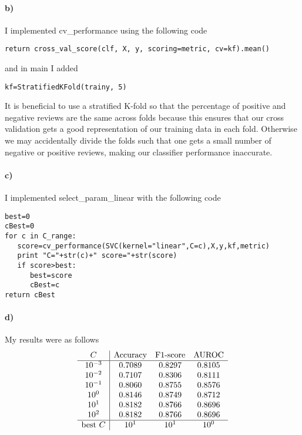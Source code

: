 \documentclass[12pt]{article}
\begin{document}
\paragraph{b)}

I implemented cv\_performance using the following code
\begin{verbatim}
return cross_val_score(clf, X, y, scoring=metric, cv=kf).mean()
\end{verbatim}
and in main I added
\begin{verbatim}
kf=StratifiedKFold(trainy, 5)
\end{verbatim}

It is beneficial to use a stratified K-fold so that the percentage of positive and negative reviews are the same across folds
because this ensures that our cross validation gets a good representation of our training data in each fold. Otherwise
we may accidentally divide the folds such that one gets a small number of negative or positive reviews, making our classifier
performance inaccurate.

\paragraph{c)}

I implemented select\_param\_linear with the following code
\begin{verbatim}
best=0
cBest=0
for c in C_range:
   score=cv_performance(SVC(kernel="linear",C=c),X,y,kf,metric)
   print "C="+str(c)+" score="+str(score)
   if score>best:
      best=score
      cBest=c
return cBest
\end{verbatim}

\paragraph{d)}

My results were as follows
\[
        \begin{array}{c|c c c}
                C & \text{Accuracy} & \text{F1-score} & \text{AUROC}\\
                \hline
                10^{-3} & 0.7089 & 0.8297 & 0.8105\\
                10^{-2} & 0.7107 & 0.8306 & 0.8111\\
                10^{-1} & 0.8060 & 0.8755 & 0.8576\\
                10^0 & 0.8146 & 0.8749 & 0.8712\\
                10^1 & 0.8182 & 0.8766 & 0.8696\\
                10^2 & 0.8182 & 0.8766 & 0.8696\\
                \hline
                \text{best } C & 10^1 & 10^1 & 10^0
        \end{array}
\]
\end{document}
